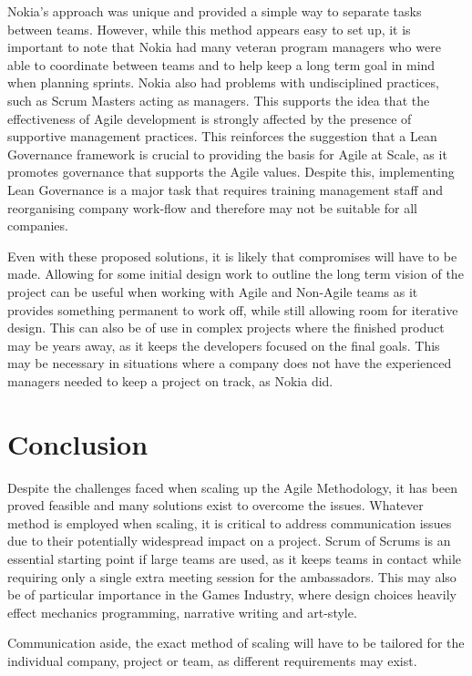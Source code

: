 \documentclass{scrartcl}
\begin{document}
Nokia's approach was unique and provided a simple way to separate tasks between teams. However, while this method appears easy to set up, it is important to note that Nokia had many veteran program managers who were able to coordinate between teams and to help keep a long term goal in mind when planning sprints. Nokia also had problems with undisciplined practices, such as Scrum Masters acting as managers. This supports the idea that the effectiveness of Agile development is strongly affected by the presence of supportive management practices. \cite{maruping2009control} This reinforces the suggestion that a Lean Governance framework is crucial to providing the basis for Agile at Scale, as it promotes governance that supports the Agile values. Despite this, implementing Lean Governance is a major task that requires training management staff and reorganising company work-flow and therefore may not be suitable for all companies.  

Even with these proposed solutions, it is likely that compromises will have to be made. \cite{reifer2003scaling} Allowing for some initial design work to outline the long term vision of the project can be useful when working with Agile and Non-Agile teams as it provides something permanent to work off, while still allowing room for iterative design. This can also be of use in complex projects where the finished product may be years away, as it keeps the developers focused on the final goals. This may be necessary in situations where a company does not have the experienced managers needed to keep a project on track, as Nokia did.


\section{Conclusion}

Despite the challenges faced when scaling up the Agile Methodology, it has been proved feasible \cite{bick2016inter} and many solutions exist to overcome the issues. Whatever method is employed when scaling, it is critical to address communication issues due to their potentially widespread impact on a project. Scrum of Scrums is an essential starting point if large teams are used, as it keeps teams in contact while requiring only a single extra meeting session for the ambassadors. This may also be of particular importance in the Games Industry, where design choices heavily effect mechanics programming, narrative writing and art-style. 

Communication aside, the exact method of scaling will have to be tailored for the individual company, project or team, as different requirements may exist.




\end{document}
